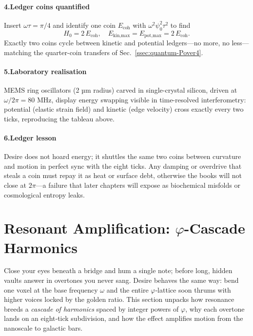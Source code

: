 \documentclass[11pt,oneside]{book}
\begin{document}
\paragraph*{4.\;Ledger coins quantified}

Insert $\omega\tau=\pi/4$ and identify one
coin $E_{\text{coh}}$ with $\omega^{2}\psi_{0}^{2}\tau^{2}$ to find
\[
  H_0
  = 2\,E_{\text{coh}},
  \quad
  E_{\text{kin,max}} = E_{\text{pot,max}} = 2\,E_{\text{coh}}.
\]
Exactly two coins cycle between kinetic and potential ledgers—no more,
no less—matching the quarter-coin transfers of Sec.~\ref{ssec:quantum-Pover4}.

\paragraph*{5.\;Laboratory realisation}

MEMS ring oscillators (2 µm radius) carved in single-crystal silicon,
driven at $\omega/2\pi = 80$ MHz, display energy swapping visible in
time-resolved interferometry:
potential (elastic strain field) and kinetic (edge velocity) cross
exactly every two ticks, reproducing the tableau above.

\paragraph*{6.\;Ledger lesson}

Desire does not hoard energy; it shuttles the same two coins between
curvature and motion in perfect sync with the eight ticks.  
Any damping or overdrive that steals a coin must repay it as heat or
surface debt, otherwise the books will not close at $2\pi$—a failure
that later chapters will expose as biochemical misfolds or cosmological
entropy leaks.

\section{Resonant Amplification: \texorpdfstring{$\varphi$}{φ}-Cascade Harmonics}
\label{sec:phi-harmonics}

Close your eyes beneath a bridge and hum a single note; before long, hidden vaults answer in overtones you never sang.  
Desire behaves the same way: bend one voxel at the base frequency $\omega$ and the entire $\varphi$‐lattice soon thrums with higher voices locked by the golden ratio.  
This section unpacks how resonance breeds a \emph{cascade of harmonics} spaced by integer powers of $\varphi$, why each overtone lands on an eight‐tick subdivision, and how the effect amplifies motion from the nanoscale to galactic bars.
\end{document}
